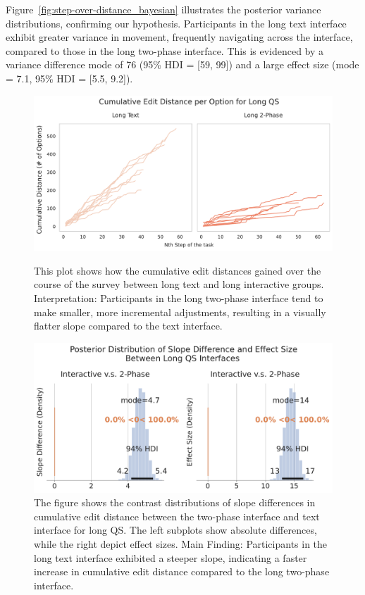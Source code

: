 Figure~\ref{fig:step-over-distance_bayesian} illustrates the posterior variance distributions, confirming our hypothesis. Participants in the long text interface exhibit greater variance in movement, frequently navigating across the interface, compared to those in the long two-phase interface. This is evidenced by a variance difference mode of 76 (95\% HDI = [59, 99]) and a large effect size (mode = 7.1, 95\% HDI = [5.5, 9.2]).

\begin{figure}[h]
    \centering
    \begin{minipage}[t]{0.48\textwidth}
        \centering
        \includegraphics[width=\textwidth]{content/image/distance/cumulative_edit_distance_per_option_long_qs_v3v4.pdf}
        \caption{This plot shows how the cumulative edit distances gained over the course of the survey between long text and long interactive groups. Interpretation: Participants in the long two-phase interface tend to make smaller, more incremental adjustments, resulting in a visually flatter slope compared to the text interface.}
        \label{fig:cumulative-distance}
    \end{minipage}
    \hfill
    \begin{minipage}[t]{0.48\textwidth}
        \centering
        \includegraphics[width=\textwidth]{content/image/distance/slope_diff_and_effect_size.pdf}
        \caption{The figure shows the contrast distributions of slope differences in cumulative edit distance between the two-phase interface and text interface for long QS. The left subplots show absolute differences, while the right depict effect sizes. Main Finding: Participants in the long text interface exhibited a steeper slope, indicating a faster increase in cumulative edit distance compared to the long two-phase interface.}
        \label{fig:slope-diff-effect}
    \end{minipage}
\end{figure}


